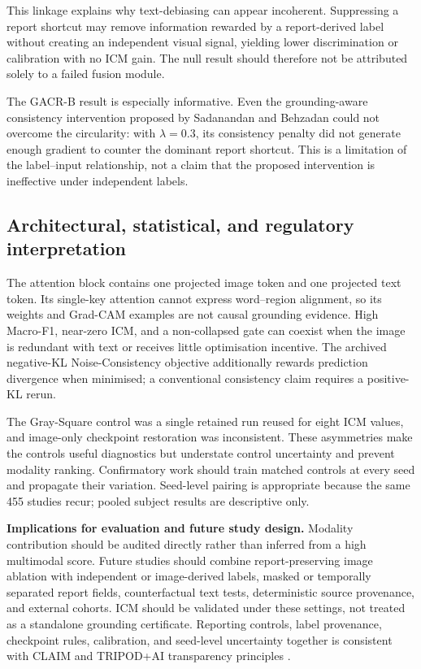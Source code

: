 This linkage explains why text-debiasing can appear incoherent. Suppressing a
report shortcut may remove information rewarded by a report-derived label
without creating an independent visual signal, yielding lower discrimination or
calibration with no ICM gain. The null result should therefore not be attributed
solely to a failed fusion module.

The GACR-B result is especially informative. Even the grounding-aware
consistency intervention proposed by Sadanandan and Behzadan
\citep{sadanandan2026consistentdangerous} could not overcome the circularity:
with $\lambda=0.3$, its consistency penalty did not generate enough gradient to
counter the dominant report shortcut. This is a limitation of the label--input
relationship, not a claim that the proposed intervention is ineffective under
independent labels.

\subsection{Architectural, statistical, and regulatory interpretation}
The attention block contains one projected image token and one projected text
token. Its single-key attention cannot express word--region alignment, so its
weights and Grad-CAM examples are not causal grounding evidence. High Macro-F1,
near-zero ICM, and a non-collapsed gate can coexist when the image is redundant
with text or receives little optimisation incentive. The archived negative-KL
Noise-Consistency objective additionally rewards prediction divergence when
minimised; a conventional consistency claim requires a positive-KL rerun.

The Gray-Square control was a single retained run reused for eight ICM values,
and image-only checkpoint restoration was inconsistent. These asymmetries make
the controls useful diagnostics but understate control uncertainty and prevent
modality ranking. Confirmatory work should train matched controls at every seed
and propagate their variation. Seed-level pairing is appropriate because the
same 455 studies recur; pooled subject results are descriptive only.

\textbf{Implications for evaluation and future study design.}
Modality contribution should be audited directly rather than inferred from a
high multimodal score. Future studies should combine report-preserving image
ablation with independent or image-derived labels, masked or temporally
separated report fields, counterfactual text tests, deterministic source
provenance, and external cohorts. ICM should be validated under these settings,
not treated as a standalone grounding certificate. Reporting controls, label
provenance, checkpoint rules, calibration, and seed-level uncertainty together
is consistent with CLAIM and TRIPOD+AI transparency principles
\citep{mongan2024claim,collins2024tripodai}.

